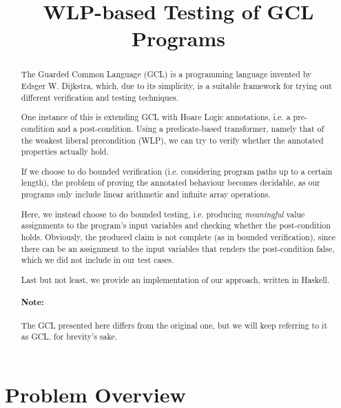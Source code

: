 \documentclass[nonatbib,numbers,10pt]{sigplanconf}
\title{WLP-based Testing of GCL Programs}
\begin{document}
\toappear{}


\maketitle

\begin{abstract}
The Guarded Common Language (GCL) is a programming language invented by Edsger W. Dijkstra, which, due to its simplicity, is a suitable framework for trying out different verification and testing techniques.

One instance of this is extending GCL with Hoare Logic annotations, i.e. a pre-condition and a post-condition. Using a predicate-based transformer, namely that of the weakest liberal precondition (WLP), we can try to verify whether the annotated properties actually hold.

If we choose to do bounded verification (i.e. considering program paths up to a certain length), the problem of proving the annotated behaviour becomes decidable, as our programs only include linear arithmetic and infinite array operations.

Here, we instead choose to do bounded testing, i.e. producing \textit{meaningful} value assignments to the program's input variables and checking whether the post-condition holds. Obviously, the produced claim is not complete (as in bounded verification), since there can be an assignment to the input variables that renders the post-condition false, which we did not include in our test cases.

Last but not least, we provide an implementation of our approach, written in Haskell.

\paragraph{Note:} The GCL presented here differs from the original one, but we will keep referring to it as GCL, for brevity's sake.
\end{abstract}



\section{Problem Overview}
\end{document}
